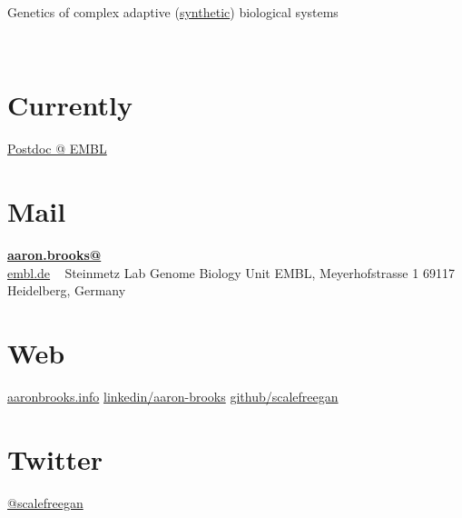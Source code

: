 \documentclass[usenames,dvipsnames]{friggeri-cv}
\begin{document}
      {\hspace{.45\textwidth} Genetics of complex adaptive \textcolor{carnelian}{(\underline{synthetic})} biological systems}


\begin{aside}
 ~
  \section{Currently}
    \href{http://www.embl.de/research/units/genome_biology/steinmetz/}{Postdoc @ EMBL}
    ~
  \section{Mail}
    \href{mailto:aaron.brooks@embl.de}{\textbf{aaron.brooks@}\\embl.de}
    ~
    Steinmetz Lab
    Genome Biology Unit
    EMBL, Meyerhofstrasse 1
    69117 Heidelberg, Germany
    ~
  \section{Web}
    \href{http://www.aaron-brooks.org}{aaronbrooks.info}
    \href{https://www.linkedin.com/pub/aaron-brooks/17/774/3b3}{linkedin/aaron-brooks}
    \href{https://github.com/scalefreegan}{github/scalefreegan}
   ~
  \section{Twitter}
    \href{https://twitter.com/scalefreegan}{@scalefreegan}
    ~

\end{aside}
\end{document}
